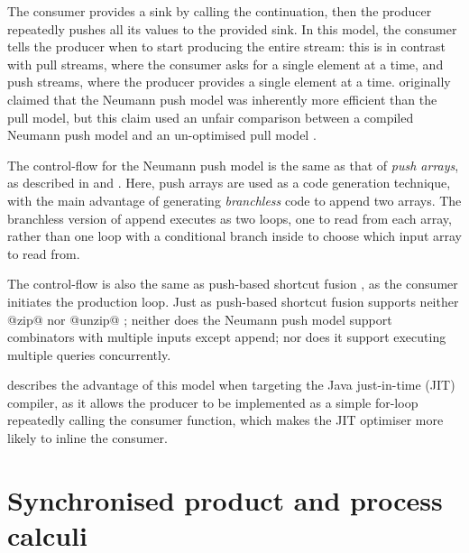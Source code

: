The consumer provides a sink by calling the continuation, then the producer repeatedly pushes all its values to the provided sink.
In this model, the consumer tells the producer when to start producing the entire stream: this is in contrast with pull streams, where the consumer asks for a single element at a time, and push streams, where the producer provides a single element at a time.
\citet{neumann2011efficiently} originally claimed that the Neumann push model was inherently more efficient than the pull model, but this claim used an unfair comparison between a compiled Neumann push model and an un-optimised pull model \cite{shaikhha2018push}.

The control-flow for the Neumann push model is the same as that of \emph{push arrays}, as described in \citet{claessen2012expressive} and \citet{svensson2014defunctionalizing}.
Here, push arrays are used as a code generation technique, with the main advantage of generating \emph{branchless} code to append two arrays.
The branchless version of append executes as two loops, one to read from each array, rather than one loop with a conditional branch inside to choose which input array to read from.

The control-flow is also the same as push-based shortcut fusion \cite{gill1993short}, as the consumer initiates the production loop.
Just as push-based shortcut fusion supports neither @zip@ nor @unzip@ \cite{svenningsson2002shortcut}; neither does the Neumann push model support combinators with multiple inputs except append; nor does it support executing multiple queries concurrently.

\citet{biboudis2017expressive} describes the advantage of this model when targeting the Java just-in-time (JIT) compiler, as it allows the producer to be implemented as a simple for-loop repeatedly calling the consumer function, which makes the JIT optimiser more likely to inline the consumer.




\section{Synchronised product and process calculi}
\label{related/synchronised-product}

